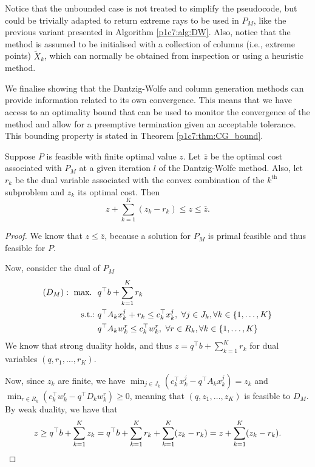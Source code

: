 Notice that the unbounded case is not treated to simplify the pseudocode, but could be trivially adapted to return extreme rays to be used in $P_M$, like the previous variant presented in Algorithm \ref{p1c7:alg:DW}. Also, notice that the method is assumed to be initialised with a collection of columns (i.e., extreme points) $\tilde{X}_k$, which can normally be obtained from inspection or using a heuristic method.

We finalise showing that the Dantzig-Wolfe and column generation methods can provide information related to its own convergence. This means that we have access to an optimality bound that can be used to monitor the convergence of the method and allow for a preemptive termination given an acceptable tolerance. This bounding property is stated in Theorem \ref{p1c7:thm:CG_bound}.

\begin{theorem} \label{p1c7:thm:CG_bound}
	Suppose $P$ is feasible with finite optimal value $z$. Let $\overline{z}$ be the optimal cost associated with $P_M$ at a given iteration $l$ of the Dantzig-Wolfe method. Also, let $r_k$ be the dual variable associated with the convex combination of the $k^\text{th}$ subproblem and $z_k$ its optimal cost. Then
		\begin{equation*}
			z + \sum_{k=1}^K (z_k - r_k) \leq z \leq \overline{z}.	
		\end{equation*}
\end{theorem}

\begin{proof}
	
	We know that $z \leq \overline{z}$, because a solution for $P_M$ is primal feasible and thus feasible for $P$.
	
	Now, consider the dual of $P_M$
	\begin{align*}
		(D_M): ~\mathop{\text{max.~}} \ & q^\top b + \sum_{k=1}^K r_k \\
		\mathop{\text{s.t.:~}} & q^\top A_k x_k^j + r_k \leq c_k^\top x_k^j, \ \forall j \in J_k, \forall k \in \left\{ 1,\dots, K \right \} \\
		& q^\top A_kw_k^r \leq c_k^\top w_k^r, \ \forall r \in R_k, \forall k \in \left\{ 1,\dots, K \right \} \\ 
	\end{align*}
	We know that strong duality holds, and thus $z = q^\top b + \sum_{k=1}^K r_k $ for dual variables $(q, r_1, \dots, r_K)$. 
	
	Now, since $z_k$ are finite, we have $\min_{j \in J_k}(c_k^\top x_k^j - q^\top A_k x_k^j) = z_k$ and $\min_{r \in R_k}(c_k^\top w_k^r - q^\top D_k w_k^r) \geq 0$, meaning that $(q, z_1, \dots, z_K)$ is feasible to $D_M$. By weak duality, we have that
	\begin{equation*}
		z \geq q^\top b + \sum_{k=1}^K	z_k = q^\top b + \sum_{k=1}^K r_k + \sum_{k=1}^K (z_k - r_k) = z + \sum_{k=1}^K (z_k - r_k). \qedhere	
	\end{equation*}
\end{proof}



